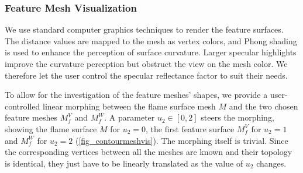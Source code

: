 \subsubsection{Feature Mesh Visualization}
%
We use standard computer graphics techniques to render the feature surfaces. The
distance values are mapped to the mesh as vertex colors, and Phong shading is
used to enhance the perception of surface curvature. Larger specular highlights
improve the curvature perception but obstruct the view on the mesh color. We
therefore let the user control the specular reflectance factor to suit their
needs.
%

To allow for the investigation of the feature meshes' shapes, we provide a 
user-controlled linear morphing between the flame surface mesh $M$ and the two
chosen feature meshes $M^{V}_{f}$ and $M^{W}_{f}$. A parameter $u_2 \in [0, 2]$
steers the morphing, showing the flame surface $M$ for $u_2 = 0$, the first
feature surface $M^{V}_{f}$ for $u_2 = 1$ and $M^{W}_{f}$ for $u_2 = 2$
(\cref{fig_contourmeshvis}). The morphing itself is trivial. Since the
corresponding vertices between all the meshes are known and their topology is
identical, they just have to be linearly translated as the value of $u_2$ changes.

